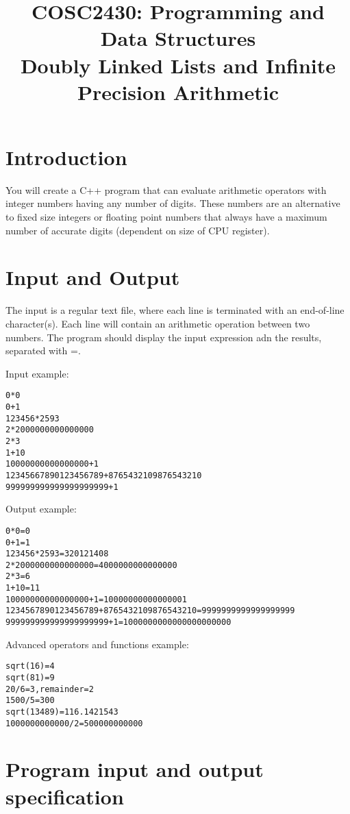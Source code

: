 \documentclass[times,11pt,verbatim,js-singlespace]{article}  %
\title{COSC2430: Programming and Data Structures\\
Doubly Linked Lists and Infinite Precision Arithmetic
}
\date{}
\begin{document}
\pagestyle{plain}
\let\thepage\relax  %

\maketitle

\section{Introduction}

You will create a C++ program that
can evaluate arithmetic operators with integer numbers having any number of digits.
These numbers are an alternative to fixed size integers or floating
point numbers that always have a maximum number of accurate digits 
(dependent on size of CPU register).

\section{Input and Output}

The input is a regular text file, where each line
is terminated with an end-of-line character(s).
Each line will contain an arithmetic operation
between two numbers.
The program should display the input expression adn the results, separated with =.

Input example:
\begin{verbatim}
0*0
0+1
123456*2593
2*2000000000000000
2*3
1+10
10000000000000000+1
12345667890123456789+8765432109876543210
999999999999999999999+1
\end{verbatim}

Output example:
\begin{verbatim}
0*0=0
0+1=1
123456*2593=320121408
2*2000000000000000=4000000000000000
2*3=6
1+10=11
10000000000000000+1=10000000000000001
1234567890123456789+8765432109876543210=9999999999999999999
999999999999999999999+1=1000000000000000000000
\end{verbatim}



Advanced operators and functions example:
\begin{verbatim}
sqrt(16)=4
sqrt(81)=9
20/6=3,remainder=2
1500/5=300
sqrt(13489)=116.1421543
1000000000000/2=500000000000
\end{verbatim}



\section{Program input and output specification}
\end{document}

